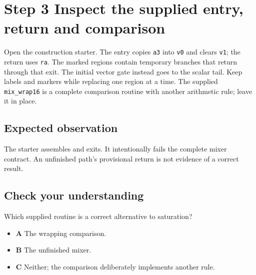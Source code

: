 \section{Step 3 Inspect the supplied entry, return and comparison}\label{pcm-s03}

Open the construction starter. The entry copies \texttt{a3} into \texttt{v0} and clears \texttt{v1}; the return uses \texttt{ra}. The marked regions contain temporary branches that return through that exit. The initial vector gate instead goes to the scalar tail. Keep labels and markers while replacing one region at a time. The supplied \texttt{mix\_wrap16} is a complete comparison routine with another arithmetic rule; leave it in place.

\subsection{Expected observation}
The starter assembles and exits. It intentionally fails the complete mixer contract. An unfinished path’s provisional return is not evidence of a correct result.

\subsection{Check your understanding}
Which supplied routine is a correct alternative to saturation?

\begin{itemize}
  \item \textbf{A} The wrapping comparison.
  \item \textbf{B} The unfinished mixer.
  \item \textbf{C} Neither; the comparison deliberately implements another rule.
\end{itemize}
